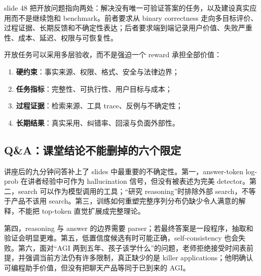 slide 48 把开放问题指向两处：解决没有唯一可验证答案的任务，以及建设真实应用而不是继续饱和 benchmark。前者要求从 binary correctness 走向多目标评价、过程证据、长期反馈和不确定性表达；后者要求端到端记录用户价值、失败严重性、成本、延迟、权限与可恢复性。



开放任务可以采用多层验收，而不是强迫一个 reward 承担全部价值：
\begin{enumerate}
  \item \textbf{硬约束}：事实来源、权限、格式、安全与法律边界；
  \item \textbf{任务指标}：完整性、可执行性、用户目标与成本；
  \item \textbf{过程证据}：检索来源、工具 trace、反例与不确定性；
  \item \textbf{长期结果}：真实采用、纠错率、回滚与负面外部性。
\end{enumerate}

\subsection{Q\&A：课堂结论不能删掉的六个限定}

讲座后的九分钟问答补上了 slides 中最重要的不确定性。第一，answer-token log-prob 在讲者经验中可作为 hallucination 信号，但没有被表述为完美 detector。第二，search 可以作为模型调用的工具；“研究 reasoning”时排除外部 search，不等于产品不该用 search。第三，训练如何重塑完整序列分布仍缺少令人满意的解释，不能把 top-token 直觉扩展成完整理论。


第四，reasoning 与 answer 的边界需要 parser；若最终答案是一段程序，抽取和验证会明显更难。第五，低置信度候选有时可能正确，self-consistency 也会失败。第六，面对“AGI 两到五年、孩子该学什么”的问题，老师拒绝接受时间表前提，并强调当前方法仍有许多限制，真正缺少的是 killer applications；他明确认可编程助手价值，但没有把聊天产品等同于已到来的 AGI。


